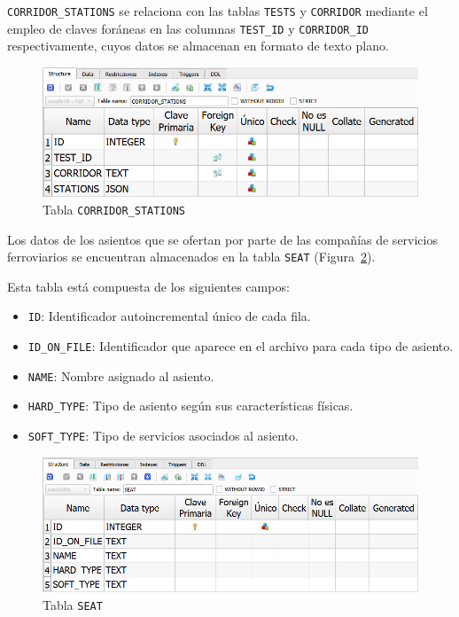 \texttt{CORRIDOR\_STATIONS} se relaciona con las tablas \texttt{TESTS} y \texttt{CORRIDOR} mediante el empleo de claves foráneas en las columnas \texttt{TEST\_ID} y \texttt{CORRIDOR\_ID} respectivamente, cuyos datos se almacenan en formato de texto plano.

\begin{figure}[H]
\centering
\includegraphics[width=.9\textwidth]{fig/Tablas base de datos/Oferta/CORRIDOR_STATIONS.png}
\caption{Tabla \texttt{CORRIDOR\_STATIONS}}
\label{fig:dbSupplyCORRIDOR_STATIONS}
\end{figure}

Los datos de los asientos que se ofertan por parte de las compañías de servicios ferroviarios se encuentran almacenados en la tabla \texttt{SEAT} (Figura~\ref{fig:dbSupplySEAT}). 

Esta tabla está compuesta de los siguientes campos: 
\begin{itemize}
    \item \texttt{ID}: Identificador autoincremental único de cada fila.
    \item \texttt{ID\_ON\_FILE}: Identificador que aparece en el archivo para cada tipo de asiento.
    \item \texttt{NAME}: Nombre asignado al asiento.
    \item \texttt{HARD\_TYPE}: Tipo de asiento según sus características físicas.
    \item \texttt{SOFT\_TYPE}: Tipo de servicios asociados al asiento.
\end{itemize}

\begin{figure}[H]
\centering
\includegraphics[width=.9\textwidth]{fig/Tablas base de datos/Oferta/SEAT.png}
\caption{Tabla \texttt{SEAT}}
\label{fig:dbSupplySEAT}
\end{figure}

